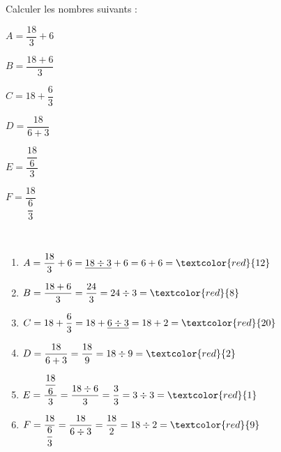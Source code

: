 \begin{exercice*} %
   Calculer les nombres suivants :
   \setlength{\columnseprule}{0pt}
   \begin{multicols}{2}
      \begin{list}{}{}
         \item $A=\dfrac{18}{3}+6$
         \item $B=\dfrac{18+6}{3}$         
         \item $C=18+\dfrac{6}{3}$
         \columnbreak         
         \item $D=\dfrac{18}{6+3}$\medskip         
         \item $E=\dfrac{\dfrac{18}{6}}{3}$\medskip
         \item $F=\dfrac{18}{\dfrac{6}{3}}$         
      \end{list}
   \end{multicols}
 \end{exercice*}
 
 \begin{corrige}
    \ \\ [-5mm]
    \begin{enumerate}
       \item $A=\dfrac{18}{3}+6 =\underline{18\div3}+6 =6+6 =\textcolor{red}{12}$ \medskip
       \item $B=\dfrac{18+6}{3} =\dfrac{24}{3} =24\div3 =\textcolor{red}{8}$ \medskip
       \item $C=18+\dfrac{6}{3} =18+\underline{6\div3} =18+2 =\textcolor{red}{20}$ \medskip
       \item $D=\dfrac{18}{6+3} =\dfrac{18}{9} =18\div9 =\textcolor{red}{2}$ \medskip
       \item $E=\dfrac{\dfrac{18}{6}}{3} =\dfrac{18\div6}{3} =\dfrac{3}{3} =3\div3 =\textcolor{red}{1}$ \medskip
       \item $F=\dfrac{18}{\dfrac{6}{3}} =\dfrac{18}{6\div3} =\dfrac{18}{2} =18\div2 =\textcolor{red}{9}$
    \end{enumerate}
 \end{corrige}